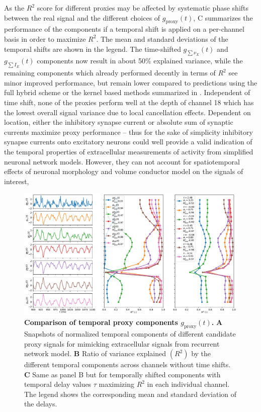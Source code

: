 As the $R^2$ score for different proxies may be affected by systematic phase shifts between the real signal and the different choices of $g_\text{proxy}(t)$, 
C summarizes the performance of the components if a temporal shift is applied on a per-channel  basis in order to maximize $R^2$. 
The mean and standard deviations of the temporal shifts are shown in the legend. 
The time-shifted $g_{\sum \nu_X}(t)$ and $g_{\sum I_E}(t)$ components now result in about 50\% explained variance, 
while the remaining components which already performed decently in terms of $R^2$ see minor improved performance, 
but remain lower compared to predictions using the full hybrid scheme or the kernel based methods summarized in . 
Independent of time shift, none of the proxies perform well at the depth of channel 18 which has the lowest overall signal variance due to local cancellation effects.
Dependent on location, 
either the inhibitory synapse current or absolute sum of synaptic currents maximize proxy performance 
-- thus for the sake of simplicity inhibitory synapse currents onto excitatory neurons could well provide a valid indication of the temporal properties of extracellular measurements of activity from simplified neuronal network models. 
However,  
they can not account for spatiotemporal effects of neuronal morphology and volume conductor model on the signals of interest,


\begin{figure}[!ht]
\begin{center}
\includegraphics[width=\textwidth]{Figures/Ch-LFPy/Ch-LFPy-g_proxy.pdf}
\end{center}
\caption{\textbf{Comparison of temporal proxy components $g_\text{proxy}(t)$.} 
{\bf A} Snapshots of normalized temporal components of different candidate proxy signals for mimicking extracellular signals from recurrent network model. 
{\bf B} Ratio of variance explained $(R^2)$ by the different temporal components across channels without time shifts. 
{\bf C} Same as panel B but for temporally shifted components with temporal delay values $\tau$ maximizing $R^2$ in each individual channel. 
The legend shows the corresponding mean and standard deviation of the delays.
}
\label{fig:g_proxy}
\end{figure}



